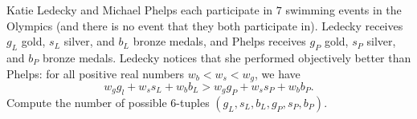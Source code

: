 Katie Ledecky and Michael Phelps each participate in $7$ swimming events in the Olympics (and there is no event that they both participate in). Ledecky receives $g_L$ gold, $s_L$ silver, and $b_L$ bronze medals, and Phelps receives $g_P$ gold, $s_P$ silver, and $b_P$ bronze medals. Ledecky notices that she performed objectively better than Phelps: for all positive real numbers $w_b<w_s<w_g$, we have
$$w_gg_l+w_ss_L+w_bb_L>w_gg_P+w_ss_P+w_bb_P.$$Compute the number of possible $6$-tuples $(g_L,s_L,b_L,g_P,s_P,b_P).$